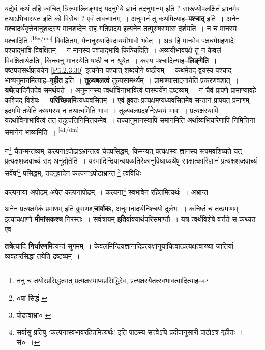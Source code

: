 \documentclass[article,12pt,a4paper]{memoir}
\begin{document}
	  \pstart यद्येवं कथं तर्हि क्वचित् त्रिरूपाल्लिङ्गाद् यदनुमेये ज्ञानं तदनुमानम् इति ? सारूप्योपलक्षितं ज्ञानमेव तथाऽभिधास्यत इति को विरोधः ? एवं तावन्मानम् । अनुमानं तु कथमित्याह--\textbf{पश्चाद्} इति । अनेन पश्चादर्थवृत्तेनानुशब्दस्य मानशब्देन सह गतिप्रादय इत्यनेन तत्पुरुषसमासं दर्शयति । न च मानस्य पश्चादिति \leavevmode\textsuperscript{\rmlatinfont\tiny [18a/ms]} विवक्षितम्, येनानुरथादिवदव्ययीभावो भवेत् । अत्र हि मानमेव पक्षधर्मग्रहणादेः पश्चाद्भावि विवक्षितम् । न मानस्य पश्चाद्भावि किञ्चिदिति । अव्ययीभावपक्षे तु न केवलं विवक्षितार्थक्षतिः, किन्त्वनु मानस्येति षष्ठी च न श्रूयेत । कस्य पश्चादित्याह--\textbf{लिङ्गेति} । षष्ठ्यतसर्थप्रत्ययेन \cref{Pā.2.3.30} इत्यनेन पश्चात् शब्दयोगे षष्ठीयम् । कथमेतद् द्वयस्य पश्चाद् भाव्यनुमानमित्याह--\textbf{गृहीत} इति । \textbf{तुल्यबलत्वं} तुल्यसामर्थ्यम् । प्रामाण्यासादनायेति प्रकरणवशात् । \textbf{यथे}त्यादिनैतदेव समर्थयते । अनुमानस्य त्वर्थाविनाभावित्वं पारम्पर्येण द्रष्टव्यम् । न चैवं प्रापणे प्रामाण्यावहे कश्चिद् विशेषः । \textbf{परिच्छिन्नमि}त्यध्यवसितम् । एवं ब्रुवतः प्रत्यक्षमप्यध्यवसितमेव सन्तानं प्रापयत् प्रमाणम् । इदमपि तथेति कथमस्य न तथात्वमिति भावः । तुल्यबलप्रदर्शनेऽप्ययं भावः । प्रत्यक्षस्यापि यदर्थाविनाभावित्वं तत् तदुत्पत्तिनिमित्तकमेव । तच्चानुमानस्यापि समानमिति अर्थाव्यभिचारेणापि निमित्तिना समानेन भाव्यमिति ।
	\pend
      \leavevmode\textsuperscript{\rmlatinfont\tiny [41/dm]}

	  \pstart न\footnote{ननु च तयोरप्रसिद्धत्वात् प्रत्यक्षस्याप्यप्रसिद्धिरेव, प्रत्यक्षस्यैतत्स्वभावत्वादित्याह--\cite{dp-msD-n}} चैतन्मन्तव्यम्--कल्पनाऽपोढाऽभ्रान्तत्वं चेदप्रसिद्धम्, किमन्यत् प्रत्यक्षस्य ज्ञानस्य रूपमवशिष्यते यत् प्रत्यक्षशब्दवाच्यं सद् अनूद्येतेति । यस्मादिन्द्रियान्वयव्यतिरेकानुविधाय्यर्थेषु साक्षात्कारिज्ञानं प्रत्यक्षशब्दवाच्यं सर्वेषां\footnote{०षां सिद्धं \cite{dp-msA} \cite{dp-msC} \cite{dp-edP} \cite{dp-edH} \cite{dp-edE}} प्रसिद्धम्, तदनुवादेन कल्पनाऽपोढाभ्रान्त-\footnote{पोढत्वाभ्रा० \cite{dp-msC} \cite{dp-msD}} त्वविधिः ।
	\pend
       

	  \pstart कल्पनाया अपोढम् अपेतं कल्पनापोढम् । कल्पना\footnote{सर्वासु प्रतिषु ‘कल्पनास्वभावरहितमित्यर्थः’ इति पाठस्य सत्त्वेऽपि प्रदीपानुसारी पाठोऽत्र गृहीतः ।--सं० ।} स्वभावेन रहितमित्यर्थः । अभ्रान्त-
	\pend
      

	  \pstart अनेन प्रत्यक्षमेकं प्रमाणम् इति ब्रुवाणश्\textbf{चार्वाकः,} अनुमानादर्थनिश्चयो दुर्लभः । कनिष्ठं च तत्प्रमाणम् इत्याचक्षाणो \textbf{मीमांसकश्च} निरस्तः । सर्वत्रायम् \textbf{इति}र्वाक्यार्थपरिसमाप्तौ । यत्र त्वर्थविशेषे वर्त्तते स कथ्यत एव ।
	\pend
      

	  \pstart \textbf{तत्रे}त्यादि \textbf{निर्धारणमि}त्यन्तं सुगमम् । केवलमिन्द्रियज्ञानादिप्रत्यक्षानुयायित्वात्प्रत्यक्षत्वाख्या जातिर्या व्यवहारसिद्धा तयेति द्रष्टव्यम् ।
	\pend
      
\end{document}
